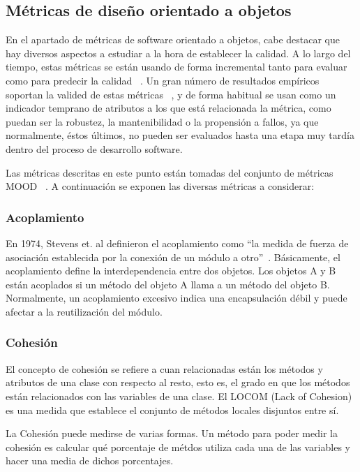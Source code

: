 \documentclass[11pt]{article}
\begin{document}
\subsection{Métricas de diseño orientado a objetos}

En el apartado de métricas de software orientado a objetos, cabe destacar que hay diversos aspectos a estudiar a la hora de establecer la calidad. A lo largo del tiempo, estas métricas se están usando de forma incremental tanto para evaluar como para predecir la calidad ~\cite{oometrics:introduction}. Un gran número de resultados empíricos soportan la valided de estas métricas ~\cite{validation:oodesignasqualityindicators}, y de forma habitual se usan como un indicador temprano de atributos a los que está relacionada la métrica, como puedan ser la robustez, la mantenibilidad o la propensión a fallos, ya que normalmente, éstos últimos, no pueden ser evaluados hasta una etapa muy tardía dentro del proceso de desarrollo software.

Las métricas descritas en este punto están tomadas del conjunto de métricas MOOD ~\cite{mood:metricsset}. A continuación se exponen las diversas métricas a considerar:

\subsubsection{Acoplamiento}
En 1974, Stevens et. al definieron el acoplamiento como ``la medida de fuerza de asociación establecida por la conexión de un módulo a otro''~\cite{structuredesign:coupling}. Básicamente, el acoplamiento define la interdependencia entre dos objetos. Los objetos A y B están acoplados si un método del objeto A llama a un método del objeto B. Normalmente, un acoplamiento excesivo indica una encapsulación débil y puede afectar a la reutilización del módulo.

\subsubsection{Cohesión}
El concepto de cohesión se refiere a cuan relacionadas están los métodos y atributos de una clase con respecto al resto, esto es, el grado en que los métodos están relacionados con las variables de una clase. El LOCOM (Lack of Cohesion) es una medida que establece el conjunto de métodos locales disjuntos entre sí.

La Cohesión puede medirse de varias formas. Un método para poder medir la cohesión es calcular qué porcentaje de métdos utiliza cada una de las variables y hacer una media de dichos porcentajes.
\end{document}

